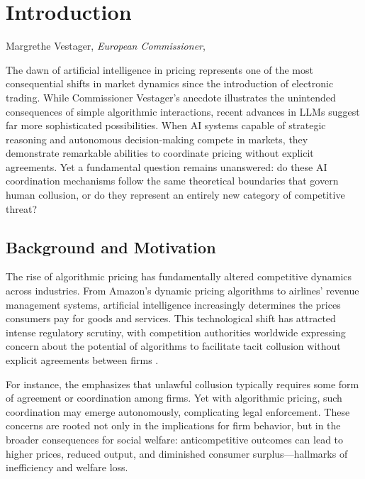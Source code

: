 \section{Introduction}\label{sec:intro}

\epigraph{}{Margrethe Vestager, \emph{European Commissioner}, ~\cite*{vestager_algorithms_2017}}

The dawn of artificial intelligence in pricing represents one of the most consequential shifts in market dynamics since the introduction of electronic trading. While Commissioner Vestager's anecdote illustrates the unintended consequences of simple algorithmic interactions, recent advances in LLMs suggest far more sophisticated possibilities. When AI systems capable of strategic reasoning and autonomous decision-making compete in markets, they demonstrate remarkable abilities to coordinate pricing without explicit agreements. Yet a fundamental question remains unanswered: do these AI coordination mechanisms follow the same theoretical boundaries that govern human collusion, or do they represent an entirely new category of competitive threat?

\subsection{Background and Motivation}
The rise of algorithmic pricing has fundamentally altered competitive dynamics across industries. From Amazon's dynamic pricing algorithms to airlines' revenue management systems, artificial intelligence increasingly determines the prices consumers pay for goods and services. This technological shift has attracted intense regulatory scrutiny, with competition authorities worldwide expressing concern about the potential of algorithms to facilitate tacit collusion without explicit agreements between firms \parencite{oecd_algorithmic_2023, harrington_developing_2018}. 

For instance, the \textcite{us_department_of_justice_price_2021} emphasizes that unlawful collusion typically requires some form of agreement or coordination among firms. Yet with algorithmic pricing, such coordination may emerge autonomously, complicating legal enforcement. These concerns are rooted not only in the implications for firm behavior, but in the broader consequences for social welfare: anticompetitive outcomes can lead to higher prices, reduced output, and diminished consumer surplus—hallmarks of inefficiency and welfare loss.

